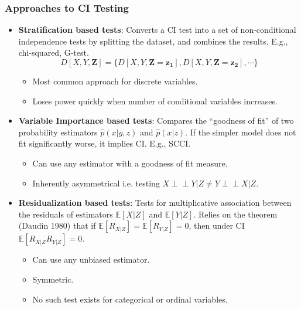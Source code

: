 \documentclass{beamer}
\def\ci{\perp\!\!\!\!\!\perp}
\begin{document}
\begin{frame}
	\frametitle{Approaches to CI Testing}
	\begin{itemize}
		\item \textbf{Stratification based tests}: Converts a CI test
			into a set of non-conditional independence tests by
			splitting the dataset, and combines the results. E.g., chi-squared, G-test.
			\vspace{-0.5em}
			$$ D[X, Y, \bm{Z}] = \{ D[X, Y, \bm{Z}=\bm{z_1}], D[X, Y, \bm{Z}=\bm{z_2}], \cdots \} $$
			\vspace{-1.5em}
			\begin{itemize}
				\item Most common approach for discrete variables.
				\item Loses power quickly when number of conditional variables increases.
			\end{itemize}
		\item \textbf{Variable Importance based tests}: Compares the
			``goodness of fit'' of two probability estimators
			$\hat{p}(x|y, z) $ and $ \hat{p}(x | z) $. If the
			simpler model does not fit significantly worse, it implies
			CI. E.g., SCCI.
			\begin{itemize}
				\item Can use any estimator with a goodness of
					fit measure.
				\item Inherently asymmetrical i.e. testing $ X \ci Y | Z \neq Y \ci X | Z $.
			\end{itemize}
		\item \textbf{Residualization based tests}: Tests for
			multiplicative association between the residuals of
			estimators $ \mathbb{E}[X | Z] $ and $ \mathbb{E}[Y|Z]
			$. Relies on the theorem (Daudin 1980) that if $
			\mathbb{E}[R_{X|Z}] = \mathbb{E}[R_{Y|Z}] = 0 $, then
			under CI $\mathbb{E}[R_{X|Z} R_{Y|Z}] = 0 $.

			\begin{itemize}
				\item Can use any unbiased estimator.
				\item Symmetric.
				\item No such test exists for categorical or ordinal variables.
			\end{itemize}
	\end{itemize}
\end{frame}
\end{document}
